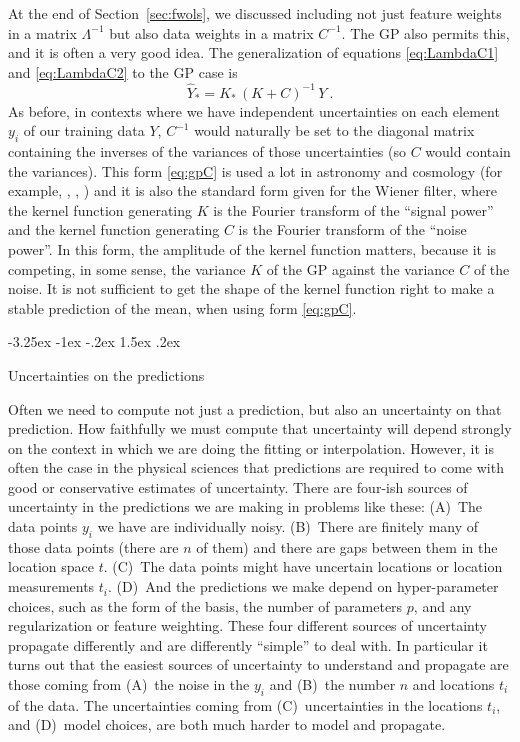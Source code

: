 \documentclass[12pt,letterpaper]{article}
\makeatletter
\renewcommand\section{\@startsection {section}{1}{\z@}%
  {-3.25ex \@plus -1ex \@minus -.2ex}%
  {1.5ex \@plus .2ex}%
  {\raggedright\normalfont\large\bfseries}}
\newcommand{\sectionname}{Section}
\makeatother
\begin{document}
At the end of \sectionname~\ref{sec:fwols}, we discussed including not just feature weights in a matrix $\Lambda^{-1}$ but also data weights in a matrix $C^{-1}$. The GP also permits this, and it is often a very good idea. The generalization of equations \eqref{eq:LambdaC1} and \eqref{eq:LambdaC2} to the GP case is 
\begin{equation}\label{eq:gpC}
    \hat{Y}_\ast = K_\ast\,(K + C)^{-1}\,Y
    ~.
\end{equation}
As before, in contexts where we have independent uncertainties on each element $y_i$ of our training data $Y$, $C^{-1}$ would naturally be set to the diagonal matrix containing the inverses of the variances of those uncertainties (so $C$ would contain the variances).
This form \eqref{eq:gpC} is used a lot in astronomy and cosmology (for example, \citealt{zaroubi}, \citealt{aigrain}, \citealt{celerite}) and it is also the standard form given for the Wiener filter, where the kernel function generating $K$ is the Fourier transform of the ``signal power'' and the kernel function generating $C$ is the Fourier transform of the ``noise power''.
In this form, the amplitude of the kernel function matters, because it is competing, in some sense, the variance $K$ of the GP against the variance $C$ of the noise.
It is not sufficient to get the shape of the kernel function right to make a stable prediction of the mean, when using form \eqref{eq:gpC}.

\section{Uncertainties on the predictions}\label{sec:uncertainty}

Often we need to compute not just a prediction, but also an uncertainty on that prediction.
How faithfully we must compute that uncertainty will depend strongly on the context in which we are doing the fitting or interpolation.
However, it is often the case in the physical sciences that predictions are required to come with good or conservative estimates of uncertainty.
There are four-ish sources of uncertainty in the predictions we are making in problems like these:
(A)~The data points $y_i$ we have are individually noisy.
(B)~There are finitely many of those data points (there are $n$ of them) and there are gaps between them in the location space $t$.
(C)~The data points might have uncertain locations or location measurements $t_i$.
(D)~And the predictions we make depend on hyper-parameter choices, such as the form of the basis, the number of parameters $p$, and any regularization or feature weighting.
These four different sources of uncertainty propagate differently and are differently ``simple'' to deal with.
In particular it turns out that the easiest sources of uncertainty to understand and propagate are those coming from (A)~the noise in the $y_i$ and (B)~the number $n$ and locations $t_i$ of the data.
The uncertainties coming from (C)~uncertainties in the locations $t_i$, and (D)~model choices, are both much harder to model and propagate.
\end{document}
